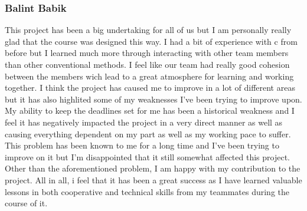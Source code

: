 \documentclass[11pt]{article}
\begin{document}
\subsubsection{Balint Babik}
This project has been a big undertaking for all of us but I am personally really glad that the course was designed this way. I had a bit of experience with c from before but I learned much more through interacting with other team members than other conventional methods. I feel like our team had really good cohesion between the members wich lead to a great atmosphere for learning  and  working together. 
I think the project has caused me to improve in a lot of different areas but it has also highlited some of my weaknesses I've been trying to improve upon. My ability to keep the deadlines set for me has been a historical weakness and I feel it has negatively impacted the project in a very direct manner as well as causing everything dependent on my part as well as my working pace to suffer. This problem has been known to me for a long time and I've been trying to improve on it but I'm disappointed that it still somewhat affected this project.
Other than the aforementioned problem, I am happy with my contribution to the project. All in all, i feel that it has been a great success as I have learned valuable lessons in both cooperative and technical skills from my teammates during the course of it. 
\end{document}
